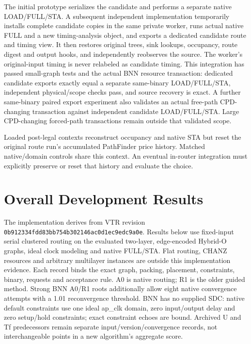 \documentclass[conference,10pt]{IEEEtran}
\begin{document}
The initial prototype serializes the candidate and performs a separate native LOAD/FULL/STA. A subsequent independent implementation temporarily installs complete candidate copies in the same private worker, runs actual native FULL and a new timing-analysis object, and exports a dedicated candidate route and timing view. It then restores original trees, sink lookups, occupancy, route digest and output hooks, and independently reobserves the source. The worker's original-input timing is never relabeled as candidate timing. This integration has passed small-graph tests and the actual BNN resource transaction: dedicated candidate exports exactly equal a separate same-binary LOAD/FULL/STA, independent physical/scope checks pass, and source recovery is exact. A further same-binary paired export experiment also validates an actual free-path CPD-changing transaction against independent candidate LOAD/FULL/STA. Large CPD-changing forced-path transactions remain outside that validated scope.

Loaded post-legal contexts reconstruct occupancy and native STA but reset the original route run's accumulated PathFinder price history. Matched native/domain controls share this context. An eventual in-router integration must explicitly preserve or reset that history and evaluate the choice.

\section{Overall Development Results}
The implementation derives from VTR revision \texttt{0b912334fdd83bb754b302146ac0d1ec9edc9a0e}. Results below use fixed-input serial clustered routing on the evaluated two-layer, edge-encoded Hybrid-O graphs, ideal clock modeling and native FULL/STA. Flat routing, CHANZ resources and arbitrary multilayer instances are outside this implementation evidence. Each record binds the exact graph, packing, placement, constraints, binary, requests and acceptance rule. A0 is native routing; R1 is the older guided method. Strong BNN A0/R1 roots additionally allow eight native convergence attempts with a 1.01 reconvergence threshold. BNN has no supplied SDC: native default constraints use one ideal ap\_clk domain, zero input/output delay and zero setup/hold constraints; exact constraint echoes are bound. Archived U and Tf predecessors remain separate input/version/convergence records, not interchangeable points in a new algorithm's aggregate score.
\end{document}
